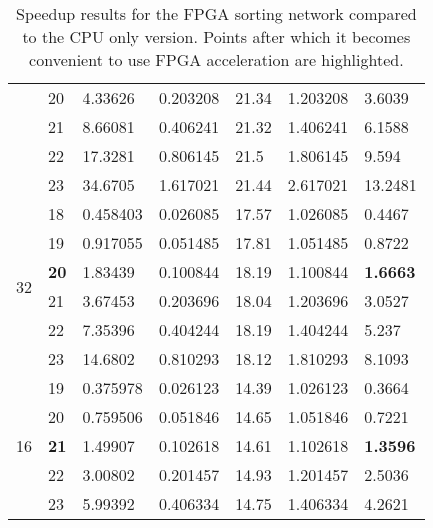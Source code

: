 \begin{table}
\begin{tabularx}{\textwidth}{X|X|X|X|X|X|X}
    & 20          & 4.33626  & 0.203208  & 21.34           & 1.203208        & 3.6039             \\
    & 21          & 8.66081  & 0.406241  & 21.32           & 1.406241        & 6.1588             \\
    & 22          & 17.3281  & 0.806145  & 21.5            & 1.806145        & 9.594              \\
    & 23          & 34.6705  & 1.617021  & 21.44           & 2.617021        & 13.2481            \\
    \hline
    \multirow{6}{*}{32}     & 18          & 0.458403 & 0.026085  & 17.57           & 1.026085        & 0.4467             \\
    & 19          & 0.917055 & 0.051485  & 17.81           & 1.051485        & 0.8722             \\
    & \textbf{20} & 1.83439  & 0.100844  & 18.19           & 1.100844        & \textbf{1.6663}    \\
    & 21          & 3.67453  & 0.203696  & 18.04           & 1.203696        & 3.0527             \\
    & 22          & 7.35396  & 0.404244  & 18.19           & 1.404244        & 5.237              \\
    & 23          & 14.6802  & 0.810293  & 18.12           & 1.810293        & 8.1093             \\
    \hline
    \multirow{5}{*}{16}  & 19          & 0.375978 & 0.026123  & 14.39           & 1.026123        & 0.3664             \\
    & 20          & 0.759506 & 0.051846  & 14.65           & 1.051846        & 0.7221             \\
    & \textbf{21} & 1.49907  & 0.102618  & 14.61           & 1.102618        & \textbf{1.3596}    \\
    & 22          & 3.00802  & 0.201457  & 14.93           & 1.201457        & 2.5036             \\
    & 23          & 5.99392  & 0.406334  & 14.75           & 1.406334        & 4.2621             \\
  \end{tabularx}
  \caption{Speedup results for the FPGA sorting network compared to
    the CPU only version. Points after which it becomes convenient to
    use FPGA acceleration are highlighted.}
  \label{table:bit-data}
\end{table}